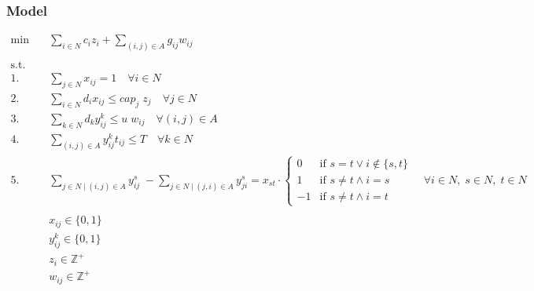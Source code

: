 \subsubsection*{Model}

\begin{align*}
    \min \quad & \sum_{i \in N} c_i z_i + \sum_{(i, j) \in A} g_{ij} w_{ij} & \\
	\\
    \text{s.t.} \quad &  \\
	1. \quad & \sum_{j \in N} x_{ij} = 1 \quad \forall i \in N  \\
	2. \quad & \sum_{i \in N} d_i x_{ij} \le cap_j \; z_j \quad \forall j \in N  \\
	3. \quad & \sum_{k \in N} d_k y_{ij}^k \le u \; w_{ij} \quad \forall (i, j) \in A \quad  \\
	4. \quad & \sum_{(i, j) \in A} y_{ij}^k t_{ij} \le T \quad \forall k \in N  \\
	5. \quad & \sum_{j \in N \mid (i, j) \in A} y_{ij}^s \; - \sum_{j \in N \mid (j, i) \in A} y_{ji}^s = x_{st} \cdot \left\{
	\begin{array}{rl}
		0  & \text{if } s = t \vee i \notin\{s, t\}  \\
		1  & \text{if } s \ne t \land i = s  \\
		-1 & \text{if } s \ne t \land i = t
	\end{array}
	\right.
	\quad \forall i \in N, \; s \in N, \; t \in N  \\
	\\
	& x_{ij} \in \{0, 1\}  \\
	& y_{ij}^k \in \{0, 1\}  \\
	& z_i \in \mathbb{Z}^+  \\
	& w_{ij} \in \mathbb{Z}^+
\end{align*}
